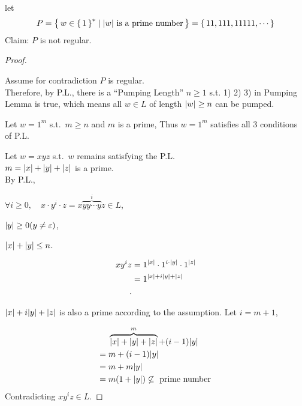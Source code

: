 


\begin{example}
    let
    \[
        P = { \left\{\, w \in { \left\{\,1\,\right\} }^* \mid \text{${ \left\lvert w \right\rvert }$ is a prime number} \,\right\} } 
          = { \left\{\,11,111,11111, \cdots\,\right\} }
    \]
    Claim: $P$ is not regular.

    \begin{proof}\

        Assume for contradiction $P$ is regular. \\
        Therefore, by P.L.,
        there is a ``Pumping Length'' $n \ge 1$ s.t.
        1) 2) 3) in Pumping Lemma is true, which means
        all $w \in L$ of length ${ \left\lvert w \right\rvert } \ge n$ can be pumped.

        Let $w = 1^m$ s.t.\ $m \ge n$ and $m$ is a prime,
        Thus $w = 1^m$ satisfies all 3 conditions of P.L.

        Let
        $w = xyz$ s.t.\ $w$ remains satisfying the P.L. \\
        $m = { \left\lvert x \right\rvert } + { \left\lvert y \right\rvert } + { \left\lvert z \right\rvert } $ is a prime. \\
        By P.L.,
        \begin{compactenum}
        \item 
            $
            \forall i \ge 0, \quad
            x \cdot y^i \cdot z = x \overbrace{yy \cdots y}^i z \in L
            $,
        \item
            $
            { \left\lvert y \right\rvert } \ge 0 ( y \neq \varepsilon)
            $,
        \item
            $
            { \left\lvert x \right\rvert } + { \left\lvert y \right\rvert } \le n
            $.
        \end{compactenum}

        \begin{align*}
            x y^i z
            &= 1^{{ \left\lvert x \right\rvert }} \cdot 1^{i \cdot { \left\lvert y \right\rvert }} \cdot 1^{{ \left\lvert z \right\rvert }}  \\
            &= 1^{{ \left\lvert x \right\rvert } + i { \left\lvert y \right\rvert } + { \left\lvert z \right\rvert }}  \\
        .\end{align*}

        ${{ \left\lvert x \right\rvert } + i { \left\lvert y \right\rvert } + { \left\lvert z \right\rvert }}$ is also a prime according to the assumption.
        Let
        $i = m+1$,

        \begin{align*}
            &\phteq \overbrace{\abs x + \abs y + \abs z}^m + (i-1)\abs y  \\
            &=      m + (i-1)\abs y  \\
            &=      m + m\abs y  \\
            &=      m(1+\abs y) \not \subseteq \text{ prime number }
            \end{align*}
        Contradicting
        $xy^iz \in L$.
    \end{proof}

\end{example}


